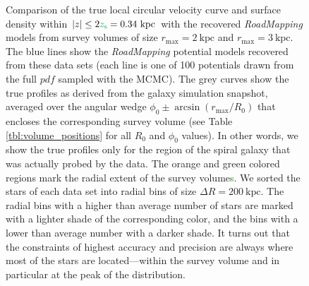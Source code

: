 \documentclass[iop,revtex4,numberedappendix,appendixfloats]{emulateapj}
\newcommand{\RM}{{\sl RoadMapping}}
\newcommand{\NEW}[1]{\textcolor{Green}{#1}}
\newcommand{\OLD}[1]{}
\begin{document}
\begin{figure}[!htbp]
\centering
\caption{Comparison of the true local circular velocity curve and surface density within $|z| \leq 2 \OLD{\times h_z}\NEW{z_\text{s}} = 0.34~\text{kpc}$ with the recovered \RM{} models from survey volumes of size $r_\text{max}=2~\text{kpc}$ and $r_\text{max}=3~\text{kpc}$. The blue lines show the \RM{} potential models recovered from these data sets (each line is one of 100 potentials drawn from the full $pdf$ sampled with the MCMC). The grey curves show the true profiles as derived from the galaxy simulation snapshot, averaged over the angular wedge $\phi_0\pm\arcsin(r_\text{max}/R_0)$ that encloses the corresponding survey volume (see Table \ref{tbl:volume_positions} for all $R_0$ and $\phi_0$ values). In other words, we show the true profiles only for the region of the spiral galaxy that was actually probed by the data. The orange and green colored regions mark the radial extent of the survey volume\NEW{s}. We sorted the stars of each data set into radial bins of size $\Delta R = 200~\text{kpc}$. The radial bins with a higher than average number of stars are marked with a lighter shade of the corresponding color, and the bins with a lower than average number with a darker shade. It turns out that the constraints of highest accuracy and precision are always where most of the stars are located---within the survey volume and in particular at the peak of the distribution.}
    \label{fig:vcirc_surfdens_suite_medium}
\end{figure}
\end{document}
